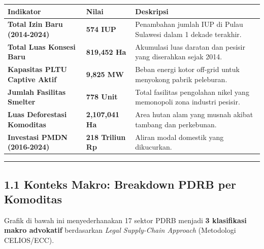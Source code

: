 \documentclass[
]{article}
\newcounter{none} %
\begin{document}
{\def\LTcaptype{none} %
\begin{longtable}[]{@{}
  >{\raggedright\arraybackslash}p{}
  >{\raggedright\arraybackslash}p{}
  >{\raggedright\arraybackslash}p{}@{}}
\toprule\noalign{}
\begin{minipage}[b]{\linewidth}\raggedright
Indikator
\end{minipage} & \begin{minipage}[b]{\linewidth}\raggedright
Nilai
\end{minipage} & \begin{minipage}[b]{\linewidth}\raggedright
Deskripsi
\end{minipage} \\
\midrule\noalign{}
\endhead
\bottomrule\noalign{}
\endlastfoot
\textbf{Total Izin Baru (2014-2024)} & \textbf{574 IUP} & Penambahan
jumlah IUP di Pulau Sulawesi dalam 1 dekade terakhir. \\
\textbf{Total Luas Konsesi Baru} & \textbf{819,452 Ha} & Akumulasi luas
daratan dan pesisir yang diserahkan sejak 2014. \\
\textbf{Kapasitas PLTU Captive Aktif} & \textbf{9,825 MW} & Beban energi
kotor off-grid untuk menyokong pabrik peleburan. \\
\textbf{Jumlah Fasilitas Smelter} & \textbf{778 Unit} & Total fasilitas
pengolahan nikel yang memonopoli zona industri pesisir. \\
\textbf{Luas Deforestasi Komoditas} & \textbf{2,107,041 Ha} & Area hutan
alam yang musnah akibat tambang dan perkebunan. \\
\textbf{Investasi PMDN (2016-2024)} & \textbf{218 Triliun Rp} & Aliran
modal domestik yang dikucurkan. \\
\end{longtable}
}

\begin{center}\rule{0.5\linewidth}{0.5pt}\end{center}

\subsection{1.1 Konteks Makro: Breakdown PDRB per
Komoditas}\label{konteks-makro-breakdown-pdrb-per-komoditas}

Grafik di bawah ini menyederhanakan 17 sektor PDRB menjadi \textbf{3
klasifikasi makro advokatif} berdasarkan \emph{Legal Supply-Chain
Approach} (Metodologi CELIOS/ECC).
\end{document}
